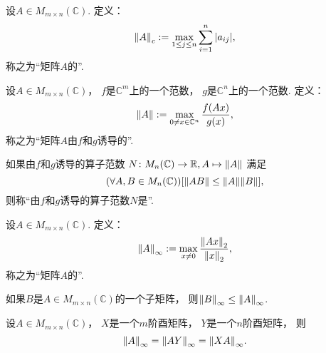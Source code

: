 \begin{definition}
设\(A \in M_{m \times n}(\mathbb{C})\).
定义：\begin{equation}
	\norm{A}_c
	:=
	\max_{1 \leq j \leq n} \sum_{i=1}^n \abs{a_{ij}},
\end{equation}
称之为“矩阵\(A\)的”.
\end{definition}

\begin{definition}
设\(A \in M_{m \times n}(\mathbb{C})\)，
\(f\)是\(\mathbb{C}^m\)上的一个范数，
\(g\)是\(\mathbb{C}^n\)上的一个范数.
定义：\begin{equation}
	\norm{A}
	:=
	\max_{0 \neq x \in \mathbb{C}^n} \frac{f(Ax)}{g(x)},
\end{equation}
称之为“矩阵\(A\)由\(f\)和\(g\)诱导的”.
\end{definition}

\begin{definition}
如果由\(f\)和\(g\)诱导的算子范数
\(N\colon M_n(\mathbb{C}) \to \mathbb{R}, A \mapsto \norm{A}\)
满足\begin{equation*}
	(\forall A,B \in M_n(\mathbb{C}))
	[
		\norm{AB}
		\leq \norm{A} \norm{B}
	],
\end{equation*}
则称“由\(f\)和\(g\)诱导的算子范数\(N\)是”.
\end{definition}

\begin{definition}
设\(A \in M_{m \times n}(\mathbb{C})\).
定义：\begin{equation}
	\norm{A}_\infty
	:=
	\max_{x\neq0} \frac{\norm{Ax}_2}{\norm{x}_2},
\end{equation}
称之为“矩阵\(A\)的”.
\end{definition}

\begin{property}
如果\(B\)是\(A \in M_{m \times n}(\mathbb{C})\)的一个子矩阵，
则\(\norm{B}_\infty \leq \norm{A}_\infty\).
\end{property}

\begin{property}
设\(A \in M_{m \times n}(\mathbb{C})\)，
\(X\)是一个\(m\)阶酉矩阵，
\(Y\)是一个\(n\)阶酉矩阵，
则\begin{equation}
	\norm{A}_\infty
	= \norm{AY}_\infty
	= \norm{XA}_\infty.
\end{equation}
\end{property}

